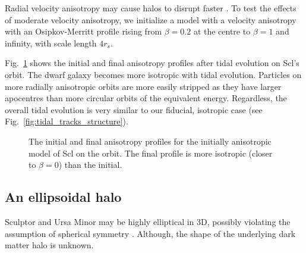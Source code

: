 Radial velocity anisotropy may cause halos to disrupt faster
\citep[e.g.][]{chiang+bosch+schive2024}. To test the effects of moderate
velocity anisotropy, we initialize a model with a velocity anisotropy
with an Osipkov-Merritt profile rising from \(\beta=0.2\) at the centre
to \(\beta=1\) and infinity, with scale length \(4r_s\).

Fig.~\ref{fig:anisotropy_i_f} shows the initial and final anisotropy
profiles after tidal evolution on Scl's \smallperi{} orbit. The dwarf
galaxy becomes more isotropic with tidal evolution. Particles on more
radially anisotropic orbits are more easily stripped as they have larger
apocentres than more circular orbits of the equivalent energy.
Regardless, the overall tidal evolution is very similar to our fiducial,
isotropic case (see Fig.~\ref{fig:tidal_tracks_structure}).

\begin{figure}
\centering
{}
\caption[Tidal evolution of anisotropy]{The initial and final anisotropy
profiles for the initially anisotropic model of Scl on the \smallperi{}
orbit. The final profile is more isotropic (closer to \(\beta=0\)) than
the initial.}\label{fig:anisotropy_i_f}
\end{figure}

\subsection{An ellipsoidal halo}\label{an-ellipsoidal-halo}

Sculptor and Ursa Minor may be highly elliptical in 3D, possibly
violating the assumption of spherical symmetry
\citep[e.g.,][]{an+koposov2022}. Although, the shape of the underlying
dark matter halo is unknown.

